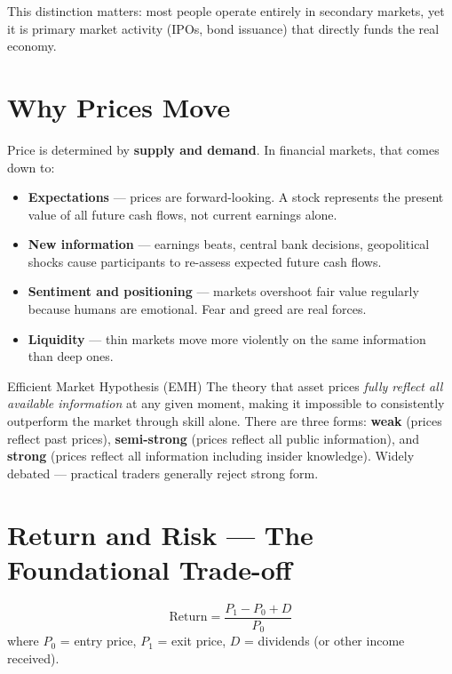 This distinction matters: most people operate entirely in secondary markets, yet it is primary
market activity (IPOs, bond issuance) that directly funds the real economy.

\section{Why Prices Move}

Price is determined by \textbf{supply and demand}. In financial markets, that comes down to:

\begin{itemize}
  \item \textbf{Expectations} — prices are forward-looking. A stock represents the present value
        of all future cash flows, not current earnings alone.
  \item \textbf{New information} — earnings beats, central bank decisions, geopolitical shocks
        cause participants to re-assess expected future cash flows.
  \item \textbf{Sentiment and positioning} — markets overshoot fair value regularly because humans
        are emotional. Fear and greed are real forces.
  \item \textbf{Liquidity} — thin markets move more violently on the same information than deep ones.
\end{itemize}

\begin{keyterm}{Efficient Market Hypothesis (EMH)}
The theory that asset prices \emph{fully reflect all available information} at any given moment,
making it impossible to consistently outperform the market through skill alone.
There are three forms: \textbf{weak} (prices reflect past prices), \textbf{semi-strong}
(prices reflect all public information), and \textbf{strong} (prices reflect all information
including insider knowledge). Widely debated — practical traders generally reject strong form.
\end{keyterm}

\section{Return and Risk — The Foundational Trade-off}

\begin{formulabox}
\[
  \text{Return} = \frac{P_1 - P_0 + D}{P_0}
\]
where $P_0$ = entry price, $P_1$ = exit price, $D$ = dividends (or other income received).
\end{formulabox}

